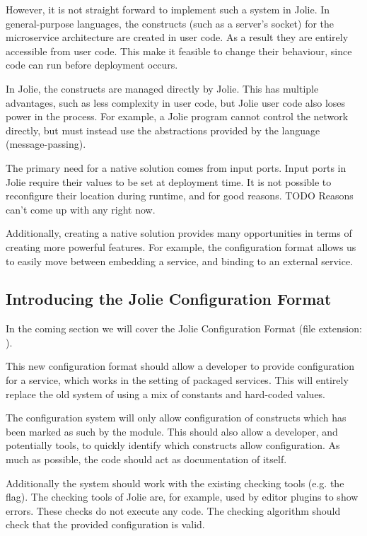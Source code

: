 
However, it is not straight forward to implement such a system in Jolie.
In general-purpose languages, the constructs (such as a server's socket) for
the microservice architecture are created in user code. As a result they are
entirely accessible from user code. This make it feasible to change their
behaviour, since code can run before deployment occurs.

In Jolie, the constructs are managed directly by Jolie. This has multiple
advantages, such as less complexity in user code, but Jolie user code also
loses power in the process. For example, a Jolie program cannot control the
network directly, but must instead use the abstractions provided by the
language (message-passing).

The primary need for a native solution comes from input ports. Input ports in
Jolie require their values to be set at deployment time. It is not possible to
reconfigure their location during runtime, and for good reasons. TODO Reasons
can't come up with any right now.

Additionally, creating a native solution provides many opportunities in terms of
creating more powerful features. For example, the configuration format allows
us to easily move between embedding a service, and binding to an external
service.

\subsection{Introducing the Jolie Configuration Format}
\label{sec:conf_units}

In the coming section we will cover the Jolie Configuration Format (file
extension: ).


This new configuration format should allow a developer to provide configuration
for a service, which works in the setting of packaged services. This will
entirely replace the old system of using a mix of constants and hard-coded
values.

The configuration system will only allow configuration of constructs which has
been marked as such by the module. This should also allow a developer, and
potentially tools, to quickly identify which constructs allow configuration.
As much as possible, the code should act as documentation of itself.

Additionally the system should work with the existing checking tools (e.g. the
 flag). The checking tools of Jolie are, for example,
used by editor plugins to show errors. These checks do not execute
any code. The checking algorithm should check that the provided
configuration is valid.


